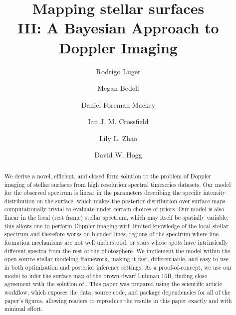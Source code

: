 \documentclass[modern]{aastex631}
\begin{document}
\title{%
    Mapping stellar surfaces\\
    III: A Bayesian Approach to Doppler Imaging
}

\author[0000-0002-0296-3826]{Rodrigo Luger}
%
\author[0000-0001-9907-7742]{Megan Bedell}
%
\author[0000-0002-9328-5652]{Daniel Foreman-Mackey}
%
\author[0000-0002-1835-1891]{Ian J. M. Crossfield}
%
\author[0000-0002-3852-3590]{Lily L. Zhao}
%
\author[0000-0003-2866-9403]{David W. Hogg}

\begin{abstract}
    We derive a novel, efficient, and closed form solution to the problem of Doppler imaging of stellar surfaces from high resolution spectral timeseries datasets.
    Our model for the observed spectrum is linear in the parameters describing the specific intensity distribution on the surface, which makes the posterior distribution over surface maps computationally trivial to evaluate under certain choices of priors.
    Our model is also linear in the local (rest frame) stellar spectrum, which may itself be spatially variable; this allows one to perform Doppler imaging with limited knowledge of the local stellar spectrum and therefore works on blended lines, regions of the spectrum where line formation mechanisms are not well understood, or stars whose spots have intrinsically different spectra from the rest of the photosphere.
    We implement the model within the open source \starry stellar modeling framework, making it fast, differentiable, and easy to use in both optimization and posterior inference settings.
    As a proof-of-concept, we use our model to infer the surface map of the brown dwarf Luhman 16B, finding close agreement with the solution of \citet{Crossfield2014}.
    This paper was prepared using the \showyourwork scientific article workflow, which exposes the data, source code, and package dependencies for all of the paper's figures, allowing readers to reproduce the results in this paper exactly and with minimal effort.
\end{abstract}
\end{document}
